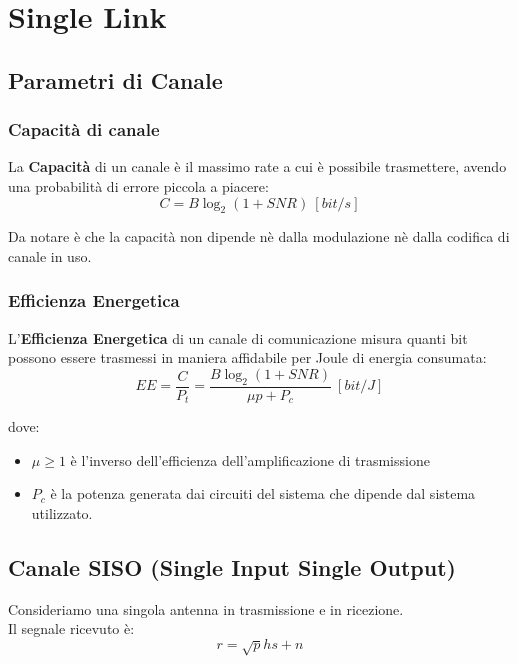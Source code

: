 \chapter{Single Link}

\section{Parametri di Canale}
\subsection{Capacità di canale}
La \textbf{Capacità} di un canale è il massimo rate a cui è possibile trasmettere, avendo una probabilità di errore piccola a piacere:
\begin{equation*}
    C = B\log_2(1 + SNR) \ [bit/s]
\end{equation*}

Da notare è che la capacità non dipende nè dalla modulazione nè dalla codifica di canale in uso.
\\

\subsection{Efficienza Energetica}
L'\textbf{Efficienza Energetica} di un canale di comunicazione misura quanti bit possono essere trasmessi in maniera affidabile per Joule di energia consumata:
\begin{equation*}
    EE =\frac{C}{P_t} = \frac{B\log_2(1 + SNR)}{\mu p + P_c}  \ [bit/J]
\end{equation*}

dove:
\begin{itemize}
    \item $\mu \geq 1$ è l'inverso dell'efficienza dell'amplificazione di trasmissione
    \item $P_c$ è la potenza generata dai circuiti del sistema che dipende dal sistema utilizzato.
\end{itemize}
\pagebreak 


\section{Canale SISO (Single Input Single Output)}
Consideriamo una singola antenna in trasmissione e in ricezione.\\

Il segnale ricevuto è:
\begin{equation*}
    r = \sqrt{p} h s + n
\end{equation*}

